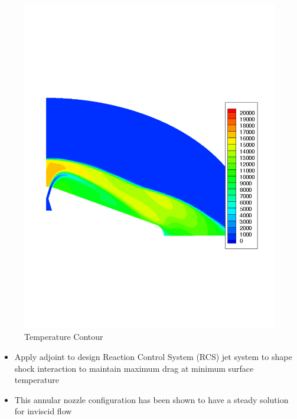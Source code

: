 \documentclass{beamer}
\begin{document}
\begin{frame}
\begin{figure}[ht]
\begin{minipage}[b]{0.4\linewidth}
         \includegraphics[scale=0.2,trim={0 8cm 0 9cm}]{figures/from_peter/T_annular}
         \caption{Temperature Contour}
         \label{fig:b}
     \end{minipage}
  \end{figure}
  \vspace{-0.5cm}
  \begin{itemize}
    \item Apply adjoint to design Reaction Control System (RCS) jet system to
      shape shock interaction to maintain maximum drag at minimum surface temperature
    \item This annular nozzle configuration has been shown to have a steady
      solution for inviscid flow
  \end{itemize}
\end{frame}
\end{document}
